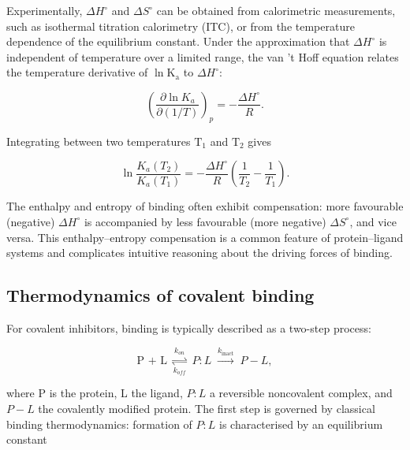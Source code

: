 \documentclass[12pt]{article}
\begin{document}
Experimentally, $\Delta H^\circ$ and $\Delta S^\circ$ can be obtained from calorimetric measurements, such as isothermal titration calorimetry (ITC), or from the temperature dependence of the equilibrium constant.\cite{CH3_holdgate2005} Under the approximation that $\Delta H^\circ$ is independent of temperature over a limited range, the van 't Hoff equation relates the temperature derivative of $\ln \textrm{K}_\textrm{a}$ to $\Delta H^\circ$:

\begin{equation}
    \left( \frac{\partial \ln K_a}{\partial (1/T)} \right)_p = -\frac{\Delta H^\circ}{R}.
\label{eq:vant_hoff1}
\end{equation}

Integrating between two temperatures $\textrm{T}_\textrm{1}$ and $\textrm{T}_\textrm{2}$ gives

\begin{equation}
    \ln \frac{K_a(T_2)}{K_a(T_1)} = -\frac{\Delta H^\circ}{R} \left( \frac{1}{T_2} - \frac{1}{T_1} \right).
\label{eq:vant_hoff2}
\end{equation}

The enthalpy and entropy of binding often exhibit compensation: more favourable (negative) $\Delta H^\circ$ is accompanied by less favourable (more negative) $\Delta S^\circ$, and vice versa.\cite{CH3_reynolds2011} This enthalpy--entropy compensation is a common feature of protein--ligand systems and complicates intuitive reasoning about the driving forces of binding.

\subsection{Thermodynamics of covalent binding}

For covalent inhibitors\cite{CH3_Strelow2017,CH3_sutanto2020}, binding is typically described as a two-step process:

\begin{equation}
    \textrm{P + L} \;\underset{k_{\!off}}{\overset{k_{\!on}}{\rightleftharpoons}}\; P\!:\!L
    \;\xrightarrow{k_{\textrm{inact}}}\;
    P\!-\!L,
\label{eq:covbind_eq1}
\end{equation}

where P is the protein, L the ligand, $P\!:\!L$ a reversible noncovalent complex, and $P\!-\!L$ the covalently modified protein. The first step is governed by classical binding thermodynamics: formation of $P\!:\!L$ is characterised by an equilibrium constant
\end{document}
